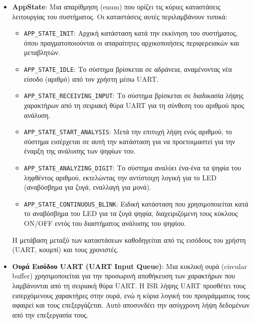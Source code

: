 \documentclass{article}
\begin{document}
\begin{itemize}
    \item \textbf{AppState}: Μια απαρίθμηση (enum) που ορίζει τις κύριες καταστάσεις λειτουργίας του συστήματος. Οι καταστάσεις αυτές περιλαμβάνουν τυπικά:
    \begin{itemize}
        \item \texttt{APP\_STATE\_INIT}: Αρχική κατάσταση κατά την εκκίνηση του συστήματος, όπου πραγματοποιούνται οι απαραίτητες αρχικοποιήσεις περιφερειακών και μεταβλητών.
        \item \texttt{APP\_STATE\_IDLE}: Το σύστημα βρίσκεται σε αδράνεια, αναμένοντας νέα είσοδο (αριθμό) από τον χρήστη μέσω UART.
        \item \texttt{APP\_STATE\_RECEIVING\_INPUT}: Το σύστημα βρίσκεται σε διαδικασία λήψης χαρακτήρων από τη σειριακή θύρα UART για τη σύνθεση του αριθμού προς ανάλυση.
        \item \texttt{APP\_STATE\_START\_ANALYSIS}: Μετά την επιτυχή λήψη ενός αριθμού, το σύστημα εισέρχεται σε αυτή την κατάσταση για να προετοιμαστεί για την έναρξη της ανάλυσης των ψηφίων του.
        \item \texttt{APP\_STATE\_ANALYZING\_DIGIT}: Το σύστημα αναλύει ένα-ένα τα ψηφία του ληφθέντος αριθμού, εκτελώντας την αντίστοιχη λογική για το LED (αναβόσβημα για ζυγά, εναλλαγή για μονά).
        \item \texttt{APP\_STATE\_CONTINUOUS\_BLINK}: Ειδική κατάσταση που χρησιμοποιείται κατά το αναβόσβημα του LED για τα ζυγά ψηφία, διαχειριζόμενη τους κύκλους ON/OFF εντός του διαστήματος ανάλυσης του ψηφίου.
    \end{itemize}
    Η μετάβαση μεταξύ των καταστάσεων καθοδηγείται από τις εισόδους του χρήστη (UART, κουμπί) και τους χρονιστές.

    \item \textbf{Ουρά Εισόδου UART (UART Input Queue)}: Μια κυκλική ουρά (circular buffer) χρησιμοποιείται για την προσωρινή αποθήκευση των χαρακτήρων που λαμβάνονται από τη σειριακή θύρα UART. Η ISR λήψης UART προσθέτει τους εισερχόμενους χαρακτήρες στην ουρά, ενώ η κύρια λογική του προγράμματος τους αφαιρεί και τους επεξεργάζεται. Αυτό αποσυνδέει την ασύγχρονη λήψη δεδομένων από την επεξεργασία τους.


\end{itemize}
\end{document}
